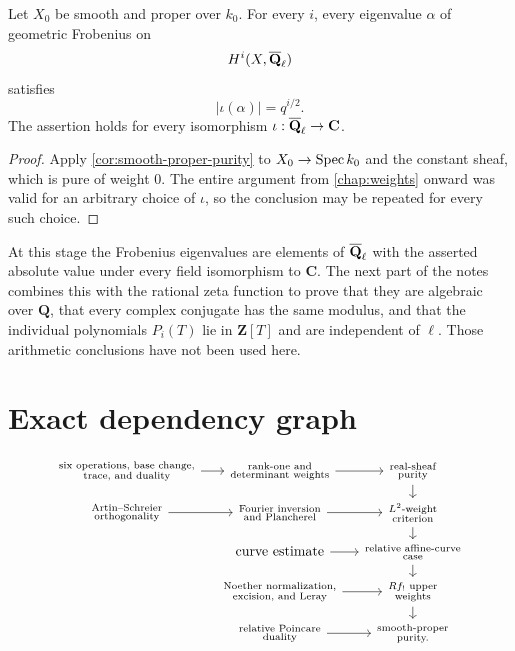 \begin{corollary}
\label{cor:cohomological-rh}
Let \(X_0\) be smooth and proper over \(k_0\).  For every \(i\), every
eigenvalue \(\alpha\) of geometric Frobenius on
\[
  H^i(X,\overline{\mathbf Q}_\ell)
\]
satisfies
\[
  |\iota(\alpha)|=q^{i/2}.
\]
The assertion holds for every isomorphism
\(\iota:\overline{\mathbf Q}_\ell\to\mathbf C\).
\end{corollary}

\begin{proof}
Apply \cref{cor:smooth-proper-purity} to
\(X_0\to\operatorname{Spec} k_0\) and the constant sheaf, which is pure of weight
\(0\).  The entire argument from \cref{chap:weights} onward was valid
for an arbitrary choice of \(\iota\), so the conclusion may be repeated
for every such choice.
\end{proof}

\begin{remark}
At this stage the Frobenius eigenvalues are elements of \(\overline{\mathbf Q}_\ell\) with
the asserted absolute value under every field isomorphism to
\(\mathbf C\).  The next part of the notes combines this with the
rational zeta function to prove that they are algebraic over
\(\mathbf Q\), that every complex conjugate has the same modulus, and
that the individual polynomials \(P_i(T)\) lie in \(\mathbf Z[T]\) and
are independent of \(\ell\).  Those arithmetic conclusions have not
been used here.
\end{remark}

\section{Exact dependency graph}

\[
\begin{tikzcd}[column sep=small,row sep=small]
\substack{\text{six operations, base change,}\\\text{trace, and duality}}
  \arrow[r] & \substack{\text{rank-one and}\\\text{determinant weights}}
  \arrow[r] & \substack{\text{real-sheaf}\\\text{purity}}
  \arrow[d] \\
\substack{\text{Artin--Schreier}\\\text{orthogonality}}
  \arrow[r] & \substack{\text{Fourier inversion}\\\text{and Plancherel}}
  \arrow[r] & \substack{\text{\(L^2\)-weight}\\\text{criterion}}
  \arrow[d] \\
& \text{curve estimate}
  \arrow[r] & \substack{\text{relative affine-curve}\\\text{case}}
  \arrow[d] \\
& \substack{\text{Noether normalization,}\\\text{excision, and Leray}}
  \arrow[r] & \substack{Rf_!\text{ upper}\\\text{weights}}
  \arrow[d] \\
& \substack{\text{relative Poincare}\\\text{duality}}
  \arrow[r] & \substack{\text{smooth-proper}\\\text{purity.}}
\end{tikzcd}
\]

